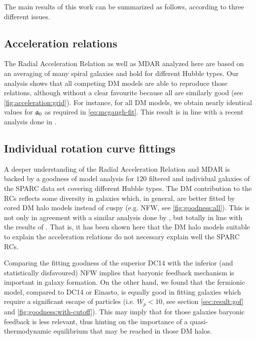 The main results of this work can be summarized as follows, according to three different issues.

\subsection{Acceleration relations}
The Radial Acceleration Relation as well as MDAR analyzed here are based on an averaging of many spiral galaxies and hold for different Hubble types. Our analysis shows that all competing DM models are able to reproduce those relations, although without a clear favourite because all are similarly good (see \cref{fig:acceleration:grid}). For instance, for all DM models, we obtain nearly identical values for $\mathfrak{a}_0$ as required in \cref{eq:mcgaugh-fit}. This result is in line with a recent analysis done in \citet{2020JCAP...06..027K}. 

\subsection{Individual rotation curve fittings}
A deeper understanding of the Radial Acceleration Relation and MDAR is backed by a goodness of model analysis for $120$ filtered and individual galaxies of the SPARC data set covering different Hubble types. The DM contribution to the RCs reflects some diversity in galaxies which, in general, are better fitted by cored DM halo models instead of cuspy (e.g. NFW, see \cref{fig:goodness:all}). This is not only in agreement with a similar analysis done by \citet{2020ApJS..247...31L}, but totally in line with the results of \citet{2020JCAP...06..027K}. That is, it has been shown here that the DM halo models suitable to explain the acceleration relations do not necessary explain well the SPARC RCs.

Comparing the fitting goodness of the superior DC14 with the inferior (and statistically disfavoured) NFW implies that baryonic feedback mechanism is important in galaxy formation. On the other hand, we found that the fermionic model, compared to DC14 or Einasto, is equally good in fitting galaxies which require a significant escape of particles (i.e. $W_p < 10$, see section \ref{sec:result:gof} and \cref{fig:goodness:with-cutoff}).  This may imply that for those galaxies baryonic feedback is less relevant, thus hinting on the importance of a quasi-thermodynamic equilibrium that may be reached in those DM halos.

